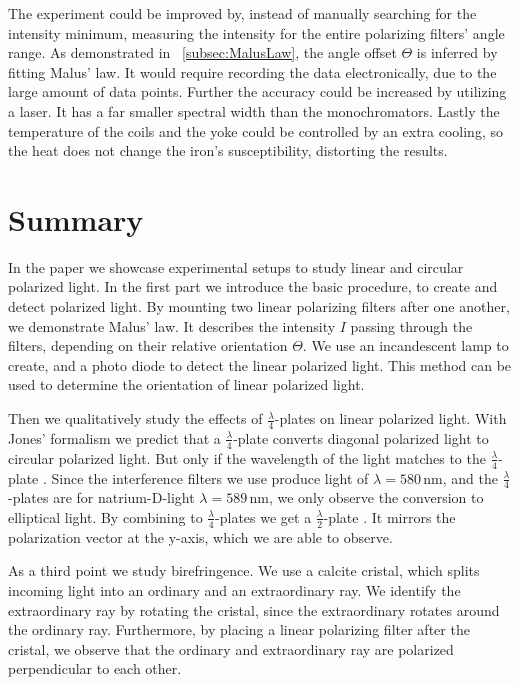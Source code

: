 \documentclass[a4paper,10pt,twocolumn]{article}
\newcommand{\quaterWavePlate}{$\frac{\lambda}{4}$-plate }
\newcommand{\quaterWavePlates}{$\frac{\lambda}{4}$-plates }
\newcommand{\halfWavePlate}{$\frac{\lambda}{2}$-plate }
\newcommand{\unit}[1]{\, \mathrm{#1}}
\newcommand{\nm}{\unit{nm}}
\newcommand{\wavelengthYellow}{580 \nm}
\begin{document}
    The experiment could be improved by, instead of manually searching for the intensity minimum,
    measuring the intensity for the entire polarizing filters' angle range.
    As demonstrated in ~\autoref{subsec:MalusLaw}, the angle offset $\Theta$ is inferred
    by fitting Malus' law.
    It would require recording the data electronically, due to the large amount of data points.
    Further the accuracy could be increased by utilizing a laser.
    It has a far smaller spectral width than the monochromators.
    Lastly the temperature of the coils and the yoke could be controlled by an extra cooling,
    so the heat does not change the iron's susceptibility, distorting the results.
    
    
    \section{Summary}
    
    In the paper we showcase experimental setups to study linear and circular polarized light.
    In the first part we introduce the basic procedure, to create and detect polarized light.
    By mounting two linear polarizing filters after one another, we demonstrate Malus' law.
    It describes the intensity $I$ passing through the filters, depending on their relative orientation $\Theta$.
    We use an incandescent lamp to create, and a photo diode to detect the linear polarized light.
    This method can be used to determine the orientation of linear polarized light.
    
    Then we qualitatively study the effects of \quaterWavePlates on linear polarized light.
    With Jones' formalism we predict that a \quaterWavePlate converts diagonal polarized light 
    to circular polarized light.
    But only if the wavelength of the light matches to the \quaterWavePlate.
    Since the interference filters we use produce light of $\lambda = \wavelengthYellow$,
    and the \quaterWavePlates are for natrium-D-light $\lambda = 589 \nm$,
    we only observe the conversion to elliptical light.
    By combining to \quaterWavePlates we get a \halfWavePlate.
    It mirrors the polarization vector at the y-axis, which we are able to observe.
    
    As a third point we study birefringence.
    We use a calcite cristal, which splits incoming light into an ordinary and an extraordinary ray.
    We identify the extraordinary ray by rotating the cristal, since the extraordinary rotates around
    the ordinary ray.
    Furthermore, by placing a linear polarizing filter after the cristal, we observe that the ordinary and
    extraordinary ray are polarized perpendicular to each other.
    
\end{document}
